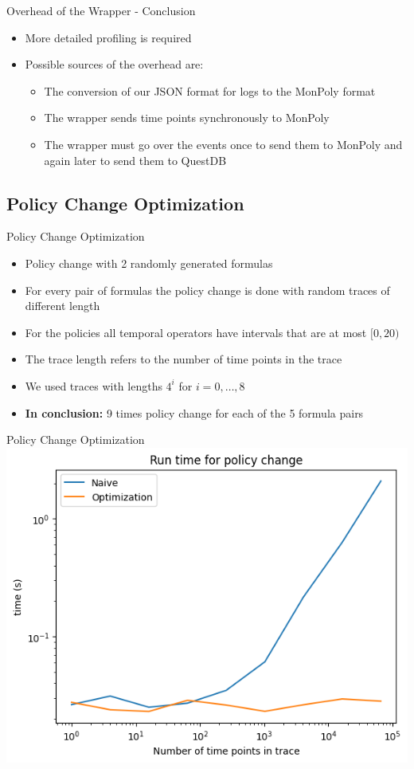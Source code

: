 \begin{frame}{Overhead of the Wrapper - Conclusion}
    \begin{itemize}
        \item More detailed profiling is required
        \item Possible sources of the overhead are:
        \begin{itemize}
            \item The conversion of our JSON format for logs to the MonPoly format
            \item The wrapper sends time points synchronously to MonPoly
            \item The wrapper must go over the events once to send them to MonPoly and again later to send them to QuestDB
        \end{itemize}
    \end{itemize}
    
\end{frame}


\subsection{Policy Change Optimization}
\begin{frame}{Policy Change Optimization}
    \begin{itemize}
        \item Policy change with 2 randomly generated formulas
        \item For every pair of formulas the policy change is done with random traces of different length
        \item For the policies all temporal operators have intervals that are at most $[0,20)$
        \item The trace length refers to the number of time points in the trace
        \item We used traces with lengths $4^i$ for $i = 0,\dots, 8$
        \item \textbf{In conclusion:} 9 times policy change for each of the 5 formula pairs
    \end{itemize}
\end{frame}

    
\begin{frame}{Policy Change Optimization}
    \centering
    \includegraphics[width=0.9\linewidth]{diagrams/policy-change-log-log.png}
\end{frame}